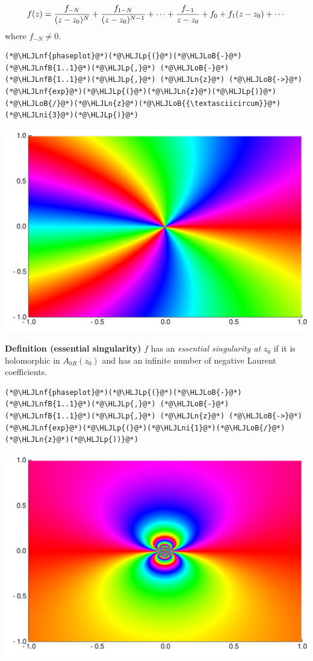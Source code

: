 \documentclass[12pt,a4paper]{article}
\newcommand{\HLJLn}[1]{#1}
\newcommand{\HLJLnf}[1]{\textcolor[RGB]{66,102,213}{#1}}
\newcommand{\HLJLnfB}[1]{\textcolor[RGB]{59,151,46}{#1}}
\newcommand{\HLJLni}[1]{\textcolor[RGB]{59,151,46}{#1}}
\newcommand{\HLJLoB}[1]{\textcolor[RGB]{102,102,102}{\textbf{#1}}}
\newcommand{\HLJLp}[1]{#1}
\begin{document}
\[
 f(z) = {f_{-N} \over (z - z_0)^N}  + {f_{1-N} \over (z - z_0)^{N-1}} +  \cdots + {f_{-1} \over z-z_0} + f_0 + f_1 (z-z_0) + \cdots
\]
where $f_{-N} \neq 0$.


\begin{lstlisting}
(*@\HLJLnf{phaseplot}@*)(*@\HLJLp{(}@*)(*@\HLJLoB{-}@*)(*@\HLJLnfB{1..1}@*)(*@\HLJLp{,}@*) (*@\HLJLoB{-}@*)(*@\HLJLnfB{1..1}@*)(*@\HLJLp{,}@*) (*@\HLJLn{z}@*) (*@\HLJLoB{->}@*) (*@\HLJLnf{exp}@*)(*@\HLJLp{(}@*)(*@\HLJLn{z}@*)(*@\HLJLp{)}@*)(*@\HLJLoB{/}@*)(*@\HLJLn{z}@*)(*@\HLJLoB{{\textasciicircum}}@*)(*@\HLJLni{3}@*)(*@\HLJLp{)}@*)
\end{lstlisting}

\includegraphics[width=\linewidth]{figures/Lecture3_4_1.pdf}

\textbf{Definition (essential singularity)} $f$ has an \emph{essential singularity at} $z_0$ if it is holomorphic in $A_{0R}(z_0)$ and has an infinite number of negative Laurent coefficients.


\begin{lstlisting}
(*@\HLJLnf{phaseplot}@*)(*@\HLJLp{(}@*)(*@\HLJLoB{-}@*)(*@\HLJLnfB{1..1}@*)(*@\HLJLp{,}@*) (*@\HLJLoB{-}@*)(*@\HLJLnfB{1..1}@*)(*@\HLJLp{,}@*) (*@\HLJLn{z}@*) (*@\HLJLoB{->}@*) (*@\HLJLnf{exp}@*)(*@\HLJLp{(}@*)(*@\HLJLni{1}@*)(*@\HLJLoB{/}@*)(*@\HLJLn{z}@*)(*@\HLJLp{))}@*)
\end{lstlisting}

\includegraphics[width=\linewidth]{figures/Lecture3_5_1.pdf}
\end{document}
